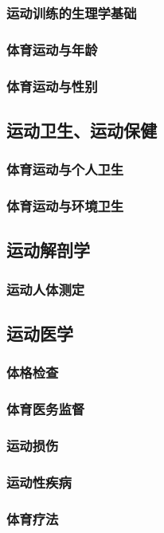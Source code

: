 \documentclass[UTF8]{../../ApplicationUniverse}
\begin{document}
        \subsubsection{运动训练的生理学基础}
        \subsubsection{体育运动与年龄}
        \subsubsection{体育运动与性别}
    \subsection{运动卫生、运动保健}
        \subsubsection{体育运动与个人卫生}
        \subsubsection{体育运动与环境卫生}
    \subsection{运动解剖学}
        \subsubsection{运动人体测定}
    \subsection{运动医学}
        \subsubsection{体格检查}
        \subsubsection{体育医务监督}
        \subsubsection{运动损伤}
        \subsubsection{运动性疾病}
        \subsubsection{体育疗法}
\end{document}
